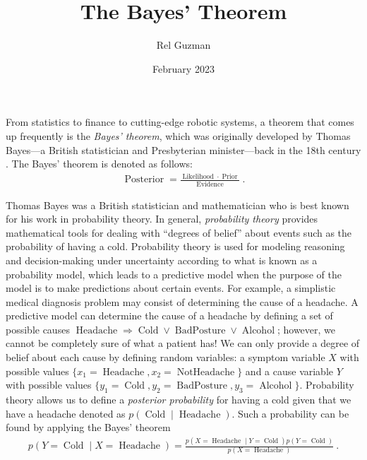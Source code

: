 

\DeclareMathOperator*{\argmax}{argmax}

\title{The Bayes' Theorem}

\author{Rel Guzman}
\date{February 2023}




\maketitle

From statistics to finance to cutting-edge robotic systems, a theorem that comes up frequently is the \textit{Bayes' theorem}, which was originally developed by Thomas Bayes—a British statistician and Presbyterian minister—back in the 18th century \parencite{andersson2022introduction}. The Bayes' theorem is denoted as follows:
\begin{align}
\operatorname{Posterior} = \frac{\operatorname{Likelihood} \cdot \operatorname{Prior}}{\operatorname{Evidence}}~.
\end{align}

Thomas Bayes was a British statistician and mathematician who is best known for his work in probability theory. In general, \textit{probability theory} provides mathematical tools for dealing with \enquote{degrees of belief} \parencite{russell2010artificial} about events such as the probability of having a cold. Probability theory is used for modeling reasoning and decision-making under uncertainty according to what is known as a probability model, which leads to a predictive model when the purpose of the model is to make predictions about certain events. For example, a simplistic medical diagnosis problem may consist of determining the cause of a headache. A predictive model can determine the cause of a headache by defining a set of possible causes $\operatorname{Headache} \Rightarrow \operatorname{Cold} \lor \operatorname{BadPosture} \lor \operatorname{Alcohol}$; however, we cannot be completely sure of what a patient has! We can only provide a degree of belief about each cause by defining random variables: a symptom variable $X$ with possible values $\{x_1=\operatorname{Headache}, x_2=\operatorname{NotHeadache}\}$ and a cause variable $Y$ with possible values $\{y_1=\operatorname{Cold}, y_2=\operatorname{BadPosture}, y_3=\operatorname{Alcohol}\}$. Probability theory allows us to define a \textit{posterior probability} for having a cold given that we have a headache denoted as $p(\operatorname{Cold} \mid \operatorname{Headache})$. Such a probability can be found by applying the Bayes' theorem
\begin{align}
p(Y=\operatorname{Cold} \mid X=\operatorname{Headache}) = \frac{p(X=\operatorname{Headache} \mid Y=\operatorname{Cold}) p(Y=\operatorname{Cold})}{p(X=\operatorname{Headache})}~.
\end{align}

